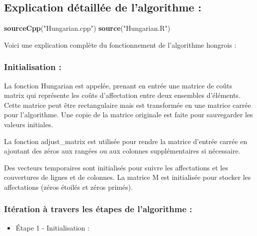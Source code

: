\documentclass[
]{article}
\newenvironment{Shaded}{\begin{snugshade}}{\end{snugshade}}
\newcommand{\FunctionTok}[1]{\textcolor[rgb]{0.13,0.29,0.53}{\textbf{#1}}}
\newcommand{\NormalTok}[1]{#1}
\newcommand{\StringTok}[1]{\textcolor[rgb]{0.31,0.60,0.02}{#1}}
\providecommand{\tightlist}{%
  \setlength{\itemsep}{0pt}\setlength{\parskip}{0pt}}
\begin{document}
\hypertarget{explication-duxe9tailluxe9e-de-lalgorithme-1}{%
\subsection{Explication détaillée de l'algorithme
:}\label{explication-duxe9tailluxe9e-de-lalgorithme-1}}

\begin{Shaded}
\begin{Highlighting}[]
\FunctionTok{sourceCpp}\NormalTok{(}\StringTok{"Hungarian.cpp"}\NormalTok{)}
\FunctionTok{source}\NormalTok{(}\StringTok{"Hungarian.R"}\NormalTok{)}
\end{Highlighting}
\end{Shaded}

Voici une explication complète du fonctionnement de l'algorithme
hongrois :

\hypertarget{initialisation}{%
\subsubsection{Initialisation :}\label{initialisation}}

La fonction Hungarian est appelée, prenant en entrée une matrice de
coûts matrix qui représente les coûts d'affectation entre deux ensembles
d'éléments. Cette matrice peut être rectangulaire mais est transformée
en une matrice carrée pour l'algorithme. Une copie de la matrice
originale est faite pour sauvegarder les valeurs initiales.

La fonction adjust\_matrix est utilisée pour rendre la matrice d'entrée
carrée en ajoutant des zéros aux rangées ou aux colonnes supplémentaires
si nécessaire.

Des vecteurs temporaires sont initialisés pour suivre les affectations
et les couvertures de lignes et de colonnes. La matrice M est
initialisée pour stocker les affectations (zéros étoilés et zéros
primés).

\hypertarget{ituxe9ration-uxe0-travers-les-uxe9tapes-de-lalgorithme}{%
\subsubsection{Itération à travers les étapes de l'algorithme
:}\label{ituxe9ration-uxe0-travers-les-uxe9tapes-de-lalgorithme}}

\begin{itemize}
\tightlist
\item
  Étape 1 - Initialisation :
\end{itemize}
\end{document}
